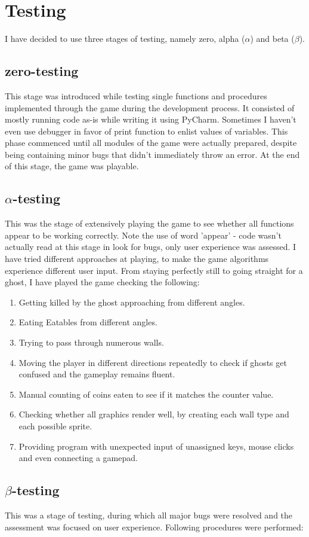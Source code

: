 \documentclass[11pt,a4paper]{report}
\newcommand{\dsubsection}[1]{\FloatBarrier \subsection{#1}}
\begin{document}
		\section{Testing}
			I have decided to use three stages of testing, namely zero, alpha ($\alpha$) and beta ($\beta$).
			\dsubsection{zero-testing}
				This stage was introduced while testing single functions and procedures implemented through the game during the development process. It consisted of mostly running code as-is while writing it using PyCharm. Sometimes I haven't even use debugger in favor of print function to enlist values of variables. This phase commenced until all modules of the game were actually prepared, despite being containing minor bugs that didn't immediately throw an error. At the end of this stage, the game was playable. 
			\dsubsection{$\alpha$-testing}
				This was the stage of extensively playing the game to see whether all functions appear to be working correctly. Note the use of word 'appear' - code wasn't actually read at this stage in look for bugs, only user experience was assessed. I have tried different approaches at playing, to make the game algorithms experience different user input. From staying perfectly still to going straight for a ghost, I have played the game checking the following:
				\begin{enumerate}
					\item
						Getting killed by the ghost approaching from different angles.
					\item
						Eating Eatables from different angles.
					\item
						Trying to pass through numerous walls.
					\item
						Moving the player in different directions repeatedly to check if ghosts get confused and the gameplay remains fluent.
					\item
						Manual counting of coins eaten to see if it matches the counter value.
					\item
						Checking whether all graphics render well, by creating each wall type and each possible sprite.
					\item
						Providing program with unexpected input of unassigned keys, mouse clicks and even connecting a gamepad.
				\end{enumerate}
			\dsubsection{$\beta$-testing}
				This was a stage of testing, during which all major bugs were resolved and the assessment was focused on user experience. Following procedures were performed:
\end{document}
